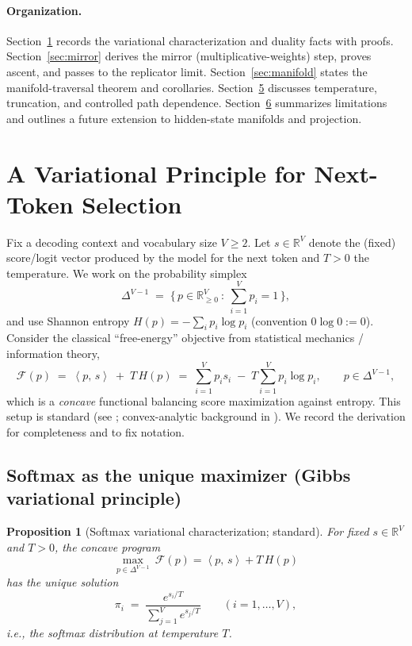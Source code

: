 \documentclass[10pt,a4paper]{amsart}
\numberwithin{equation}{section}
\theoremstyle{plain}
\newtheorem{proposition}[theorem]{Proposition}
\theoremstyle{definition}
\theoremstyle{remark}
\newcommand{\R}{\mathbb{R}}
\newcommand{\1}{\mathbbm{1}}
\newcommand{\ip}[2]{\left\langle #1,\, #2 \right\rangle}
\newcommand{\Hent}{H}
\newcommand{\simplex}{\Delta^{V-1}}
\begin{document}
\paragraph{Organization.}
Section~\ref{sec:variational} records the variational characterization and duality facts with proofs.
Section~\ref{sec:mirror} derives the mirror (multiplicative-weights) step, proves ascent, and passes
to the replicator limit. Section~\ref{sec:manifold} states the manifold-traversal theorem and corollaries.
Section~\href{https://arxiv.org/abs/2508.21186v1}{5} discusses temperature, truncation, and controlled path dependence.
Section~\href{https://arxiv.org/abs/2508.21186v1}{6} summarizes limitations and outlines a future extension to hidden-state
manifolds and projection.



\section{A Variational Principle for Next-Token Selection}\label{sec:variational}

Fix a decoding context and vocabulary size $V\ge 2$. Let $s\in\R^V$ denote the (fixed) score/logit vector produced by the model for the next token and $T>0$ the temperature. We work on the probability simplex
\[
\simplex \;=\; \big\{\, p\in\R^V_{\ge 0}\ :\ \sum_{i=1}^V p_i = 1 \,\big\},
\]
and use Shannon entropy $\Hent(p)=-\sum_i p_i\log p_i$ (convention $0\log 0:=0$). Consider the
classical “free-energy” objective from statistical mechanics / information theory,
\begin{equation}\label{eq:free-energy}
\mathcal{F}(p)\;=\;\ip{p}{s}\;+\;T\,\Hent(p)
\;=\;\sum_{i=1}^V p_i s_i \;-\; T\sum_{i=1}^V p_i \log p_i,
\qquad p\in\simplex,
\end{equation}
which is a \emph{concave} functional balancing score maximization against entropy. This setup is standard
(see \citep{jaynes1957information,cover2006elements}; convex-analytic background in \citealp[Ch.~3]{boyd2004convex}).
We record the derivation for completeness and to fix notation.

\subsection{Softmax as the unique maximizer (Gibbs variational principle)}
\begin{proposition}[Softmax variational characterization; standard]\label{prop:softmax-variational}
For fixed $s\in\R^V$ and $T>0$, the concave program
\[
\max_{p\in\simplex}\ \mathcal{F}(p)=\ip{p}{s}+T\,\Hent(p)
\]
has the unique solution
\[
\pi_i \;=\; \frac{e^{s_i/T}}{\sum_{j=1}^V e^{s_j/T}}
\qquad (i=1,\dots,V),
\]
i.e., the softmax distribution at temperature $T$.
\end{proposition}
\end{document}
